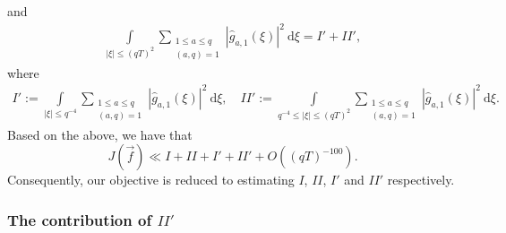 \documentclass[12pt]{amsart}
\theoremstyle{definition}
\theoremstyle{plain}
\theoremstyle{remark}
\numberwithin{equation}{section}
\numberwithin{theorem}{section}
\numberwithin{equation}{section}
\begin{document}
	and
	\begin{align*}
		\int\limits_{|\xi|\leq (qT)^{2}}\sum_{\substack{1 \leq a \leq q \\ (a, q)=1}}|\hat{g}_{a,1}(\xi)|^{2}\: \mathrm{d} \xi = I'+II',
	\end{align*}
	where 
	\begin{align*}
		I':= \int\limits_{|\xi|\leq q^{-4}}\sum_{\substack{1 \leq a \leq q \\ (a, q)=1}}|\hat{g}_{a,1}(\xi)|^{2}\: \mathrm{d} \xi, \quad II':= \int\limits_{q^{-4}\leq |\xi|\leq (qT)^{2}}\sum_{\substack{1 \leq a \leq q \\ (a, q)=1}}|\hat{g}_{a,1}(\xi)|^{2}\: \mathrm{d} \xi.
	\end{align*}
	Based on the above, we have that
	\begin{equation}\label{sepJf}
		J(\overrightarrow{f})\ll I+II+I'+II'+O((qT)^{-100}).
	\end{equation}
	Consequently, our objective is reduced to estimating $I$, $II$, $I'$ and $II'$ respectively.
	
	\subsubsection{The contribution of $II'$} \label{affTcII'}
	
\end{document}
